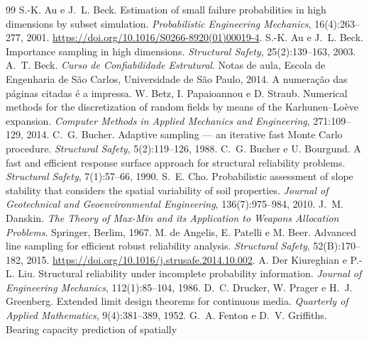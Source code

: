 \documentclass[11pt,a4paper]{article}
\begin{document}


\begin{thebibliography}{99}
 S.-K. Au e J.~L. Beck. Estimation of small failure probabilities in high dimensions
  by subset simulation. \emph{Probabilistic Engineering Mechanics}, 16(4):263--277, 2001.
  \url{https://doi.org/10.1016/S0266-8920(01)00019-4}.
 S.-K. Au e J.~L. Beck. Importance sampling in high dimensions. \emph{Structural
  Safety}, 25(2):139--163, 2003.
 A.~T. Beck. \emph{Curso de Confiabilidade Estrutural}. Notas de aula, Escola de
  Engenharia de São Carlos, Universidade de São Paulo, 2014. A numeração das páginas citadas é a impressa.
 W. Betz, I. Papaioannou e D. Straub. Numerical methods for the discretization of
  random fields by means of the Karhunen--Loève expansion. \emph{Computer Methods in Applied Mechanics and
  Engineering}, 271:109--129, 2014.
 C.~G. Bucher. Adaptive sampling --- an iterative fast Monte Carlo procedure.
  \emph{Structural Safety}, 5(2):119--126, 1988.
 C.~G. Bucher e U. Bourgund. A fast and efficient response surface approach
  for structural reliability problems. \emph{Structural Safety}, 7(1):57--66, 1990.
 S.~E. Cho. Probabilistic assessment of slope stability that considers the spatial
  variability of soil properties. \emph{Journal of Geotechnical and Geoenvironmental Engineering}, 136(7):975--984, 2010.
 J.~M. Danskin. \emph{The Theory of Max-Min and its Application to Weapons
  Allocation Problems}. Springer, Berlim, 1967.
 M. de Angelis, E. Patelli e M. Beer. Advanced line sampling for
  efficient robust reliability analysis. \emph{Structural Safety}, 52(B):170--182, 2015.
  \url{https://doi.org/10.1016/j.strusafe.2014.10.002}.
 A. Der Kiureghian e P.-L. Liu. Structural reliability under
  incomplete probability information. \emph{Journal of Engineering Mechanics}, 112(1):85--104, 1986.
 D.~C. Drucker, W. Prager e H.~J. Greenberg. Extended limit design theorems
  for continuous media. \emph{Quarterly of Applied Mathematics}, 9(4):381--389, 1952.
 G.~A. Fenton e D.~V. Griffiths. Bearing capacity prediction of spatially

\end{thebibliography}
\end{document}
